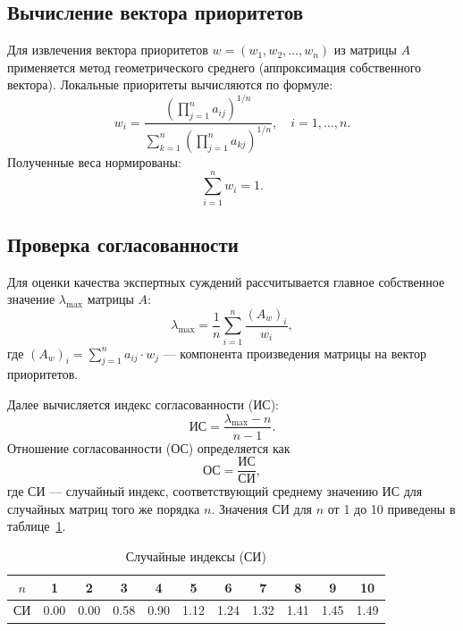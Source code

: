 \subsection*{Вычисление вектора приоритетов}

Для извлечения вектора приоритетов \(w = (w_1, w_2, \dots, w_n)\) из матрицы \(A\) применяется метод геометрического среднего (аппроксимация собственного вектора). 
Локальные приоритеты вычисляются по формуле:
\begin{equation}
	w_i = \frac{\left( \prod_{j=1}^{n} a_{ij} \right)^{1/n}}{ \sum_{k=1}^{n} \left( \prod_{j=1}^{n} a_{kj} \right)^{1/n} }, \quad i=1,\dots,n.
	\label{eq:vec_prior}
\end{equation}
Полученные веса нормированы: 
\begin{equation}
	\sum_{i=1}^{n} w_i = 1.
	\label{eq:weights}
\end{equation}

\subsection*{Проверка согласованности}

Для оценки качества экспертных суждений рассчитывается главное собственное значение \(\lambda_{\max}\) матрицы \(A\):
\begin{equation}
	\lambda_{\max} = \frac{1}{n} \sum_{i=1}^{n} \frac{(A_w)_i}{w_i},
	\label{eq:soglas}
\end{equation}
где \((A_w)_i = \sum_{j=1}^{n} a_{ij}\cdot w_j\) --- компонента произведения матрицы на вектор приоритетов.

Далее вычисляется индекс согласованности (ИС):
\begin{equation}
	\text{ИС} = \frac{\lambda_{\max} - n}{n-1}.
	\label{eq:indeis}
\end{equation}
Отношение согласованности (ОС) определяется как
\begin{equation}
	\text{ОС} = \frac{\text{ИС}}{\text{СИ}},
	\label{eq:os}
\end{equation}
где СИ --- случайный индекс, соответствующий среднему значению ИС для случайных матриц того же порядка \(n\).
\clearpage
Значения СИ для \(n\) от 1 до 10 приведены в таблице~\ref{tab:ri}.
\begin{table}[H]
\centering
\caption{Случайные индексы (СИ)}
\label{tab:ri}
\begin{tabular}{|c|c|c|c|c|c|c|c|c|c|c|}
\hline
\(n\) & 1 & 2 & 3 & 4 & 5 & 6 & 7 & 8 & 9 & 10 \\
\hline
СИ & 0.00 & 0.00 & 0.58 & 0.90 & 1.12 & 1.24 & 1.32 & 1.41 & 1.45 & 1.49 \\
\hline
\end{tabular}
\end{table}

